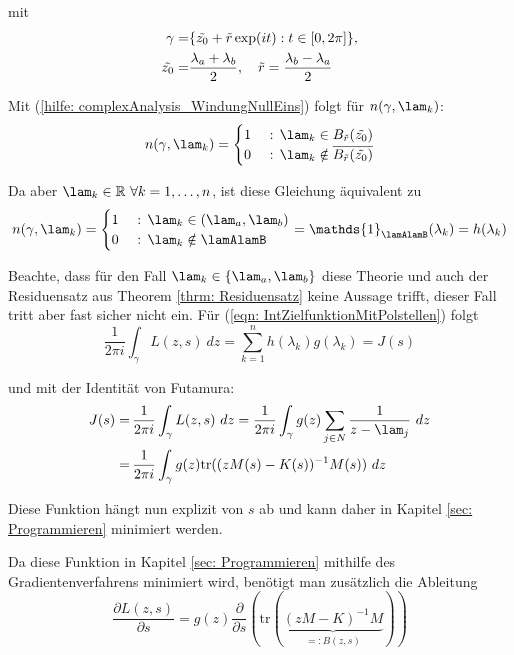 \documentclass[a4paper,12pt]{report}
\newcommand{\R}{\mathbb R}
\newcommand{\klammer}[1]{\left(#1\right)}
\newcommand{\tr}{\text{tr}}
\newcommand{\inv}{^{-1}}
\newcommand{\1}{\mathds{1}}
\theoremstyle{plain} %
\theoremstyle{definition} %
\theoremstyle{remark}
\begin{document}
            mit \begin{align}
                  \gamma =& \{\Tilde{z_0} + \Tilde r\exp(i t): t\in [0,2\pi]\},\label{def: Kreis}\\
                  \Tilde{z_0} =& \frac {\lambda_a+\lambda_b} {2},\quad\Tilde r = \frac {\lambda_b-\lambda_a} {2}\nonumber
            \end{align}

            Mit (\ref{hilfe: complexAnalysis_WindungNullEins}) folgt für $n(\gamma, \lam_k)$:
            $$n(\gamma, \lam_k) = \begin{cases}
                  1& \text{ : }\lam_k\in B_{\Tilde{r}}(\Tilde{z_0})\\
                  0& \text{ : }\lam_k\notin\overline {B_{\Tilde{r}}(\Tilde{z_0})}
            \end{cases}$$
            
            Da aber $\lam_k\in \R\ \forall k=1,\dots,n$, ist diese Gleichung äquivalent zu
            $$n(\gamma, \lam_k) = \begin{cases}
                  1& \text{ : }\lam_k\in (\lam_a,\lam_b)\\
                  0& \text{ : }\lam_k\notin \lamAlamB
            \end{cases} = \1_{\lamAlamB}(\lambda_k) = h(\lambda_k)$$

            Beachte, dass für den Fall $\lam_k \in \{\lam_a, \lam_b\}$ diese Theorie und auch der Residuensatz aus Theorem \ref{thrm: Residuensatz} keine Aussage trifft, dieser Fall tritt aber fast sicher nicht ein.
            Für (\ref{eqn: IntZielfunktionMitPolstellen}) folgt
            $$\frac 1 {2\pi i}\int_\gamma L(z,s)\ dz = \sum_{k=1}^{n} h(\lambda_k) g(\lambda_k) = J(s)$$
            
            und mit der Identität von Futamura:
            \begin{align}
                  J(s) =&\, \frac 1 {2\pi i}\int_\gamma L(z,s)\ dz = \frac 1 {2\pi i}\int_\gamma g(z)\sum_{j\in N} \frac{1}{z-\lam_j}\ dz\nonumber\\
                  =&\, \frac 1 {2\pi i}\int_\gamma g(z)\tr((zM(s)-K(s))\inv M(s))\ dz\label{eqn: JGleichIntTr}
            \end{align}

            Diese Funktion hängt nun explizit von $s$ ab und kann daher in Kapitel \ref{sec: Programmieren} minimiert werden.
            
            Da diese Funktion in Kapitel \ref{sec: Programmieren} mithilfe des Gradientenverfahrens minimiert wird, benötigt man zusätzlich die Ableitung
            \begin{equation}
                  \label{eqn: AbleitungZielfunktion}
                  \frac{\partial L(z,s)}{\partial s} = g(z) \frac{\partial}{\partial s}\klammer{\tr(\underbrace{(zM-K)\inv M}_{=:B(z, s)})}
            \end{equation}
\end{document}
